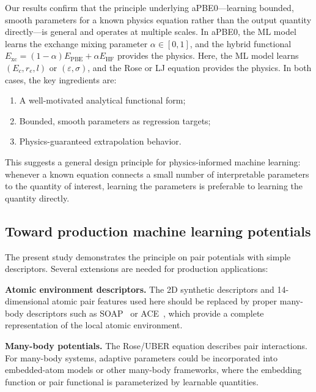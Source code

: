 \documentclass[aps,prb,twocolumn,superscriptaddress,longbibliography,floatfix]{revtex4-2}
\begin{document}
Our results confirm that the principle underlying aPBE0---learning bounded, smooth parameters for a known physics equation rather than the output quantity directly---is general and operates at multiple scales. In aPBE0, the ML model learns the exchange mixing parameter $\alpha \in [0, 1]$, and the hybrid functional $E_\mathrm{xc} = (1-\alpha)E_\mathrm{PBE} + \alpha E_\mathrm{HF}$ provides the physics. Here, the ML model learns $(E_c, r_e, l)$ or $(\varepsilon, \sigma)$, and the Rose or LJ equation provides the physics. In both cases, the key ingredients are:
\begin{enumerate}
  \item A well-motivated analytical functional form;
  \item Bounded, smooth parameters as regression targets;
  \item Physics-guaranteed extrapolation behavior.
\end{enumerate}

This suggests a general design principle for physics-informed machine learning: whenever a known equation connects a small number of interpretable parameters to the quantity of interest, learning the parameters is preferable to learning the quantity directly.

\subsection{Toward production machine learning potentials}
\label{sec:outlook}

The present study demonstrates the principle on pair potentials with simple descriptors. Several extensions are needed for production applications:

\textbf{Atomic environment descriptors.} The 2D synthetic descriptors and 14-dimensional atomic pair features used here should be replaced by proper many-body descriptors such as SOAP~\cite{Bartok2010,Musil2021} or ACE~\cite{Drautz2019}, which provide a complete representation of the local atomic environment.

\textbf{Many-body potentials.} The Rose/UBER equation describes pair interactions. For many-body systems, adaptive parameters could be incorporated into embedded-atom models or other many-body frameworks, where the embedding function or pair functional is parameterized by learnable quantities.
\end{document}
